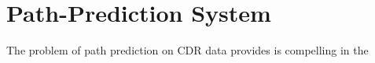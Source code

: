 \documentclass[11pt]{amsart}
\title{}
\author{Joseph Cunningham}
\date{}
\theoremstyle{definition}
\begin{document}
\section{Path-Prediction System}

The problem of path prediction on CDR data provides is compelling in the 
\end{document}
